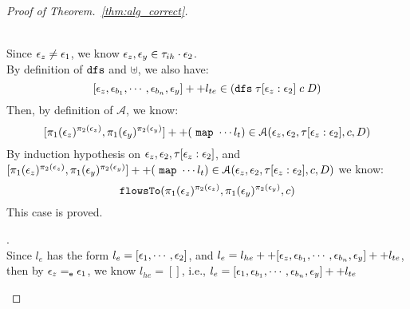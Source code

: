 \begin{proof}[Proof of Theorem.~\ref{thm:alg_correct}]
\begin{case}
\begin{subcase}
%
\\
Since $\mathtt{\epsilon}_z \neq \mathtt{\epsilon}_1$, we know $\mathtt{\epsilon}_z, \mathtt{\epsilon}_y \in \mathtt{\tau}_{ih} \cdot \mathtt{\epsilon}_2$.
\\
By definition of $\mathtt{dfs}$ and $\uplus$,  we also have:
\[
  [\mathtt{\epsilon}_z, \mathtt{\epsilon}_{b_1}, \cdots, \mathtt{\epsilon}_{b_n}, \mathtt{\epsilon}_y] ++ l_{te} \in (\mathtt{dfs} \; {\mathtt{\tau}[\mathtt{\epsilon}_z: \mathtt{\epsilon}_2] } \; c \; D)
\]
%
Then, by definition of $\mathcal{A}$, we know:
\[
  [\pi_1(\mathtt{\epsilon}_z)^{\pi_2(\mathtt{\epsilon}_z)}, \pi_1(\mathtt{\epsilon}_y)^{\pi_2(\mathtt{\epsilon}_y)}] ++ (~\mathtt{map}~ \cdots l_t )
  \in\mathcal{A}(\mathtt{\epsilon}_z, \mathtt{\epsilon}_2, \mathtt{\tau}[\mathtt{\epsilon}_z: \mathtt{\epsilon}_2], c, D)
\]
%
%
By induction hypothesis on $\mathtt{\epsilon}_z, \mathtt{\epsilon}_2, \mathtt{\tau}[\mathtt{\epsilon}_z: \mathtt{\epsilon}_2]$,
 and 
 \\
 $[\pi_1(\mathtt{\epsilon}_z)^{\pi_2(\mathtt{\epsilon}_z)}, \pi_1(\mathtt{\epsilon}_y)^{\pi_2(\mathtt{\epsilon}_y)}] ++ (~\mathtt{map}~ \cdots l_t )
 \in\mathcal{A}(\mathtt{\epsilon}_z, \mathtt{\epsilon}_2, \mathtt{\tau}[\mathtt{\epsilon}_z: \mathtt{\epsilon}_2], c, D)$ we know:
\[
  \mathtt{flowsTo}(\pi_1(\mathtt{\epsilon}_z)^{\pi_2(\mathtt{\epsilon}_z)}, \pi_1(\mathtt{\epsilon}_y)^{\pi_2(\mathtt{\epsilon}_y)}, c)
\]
This case is proved.
%
\end{subcase}
\begin{subcase}.
  \label{case:asn_ind}
\\
Since $l_e$ has the form $l_e = [\mathtt{\epsilon}_1, \cdots, \mathtt{\epsilon}_2] $, 
and $l_e = l_{he} ++ [\mathtt{\epsilon}_z, \mathtt{\epsilon}_{b_1}, \cdots, \mathtt{\epsilon}_{b_n}, \mathtt{\epsilon}_y] ++ l_{te}$, 
then by $\mathtt{\epsilon}_z =_{\mathtt{e}} \mathtt{\epsilon}_1$, we know $l_{he} = []$, i.e., $l_e = [\mathtt{\epsilon}_1, \mathtt{\epsilon}_{b_1}, \cdots, \mathtt{\epsilon}_{b_n}, \mathtt{\epsilon}_y] ++ l_{te}$

\end{subcase}
\end{case}
\end{proof}

